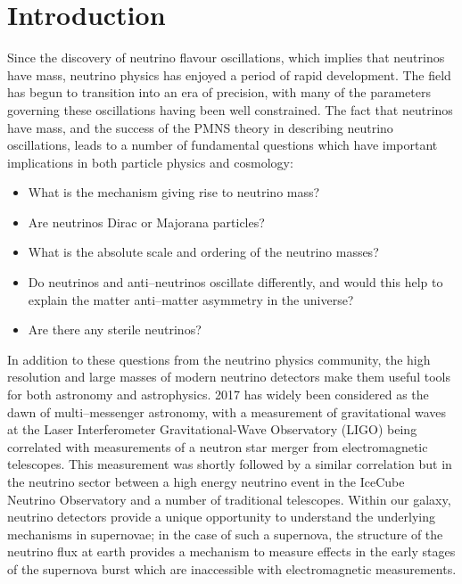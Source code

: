 \chapter{\label{ch:intro}Introduction} 

\minitoc

Since the discovery of neutrino flavour oscillations, which implies that
neutrinos have mass, neutrino physics has enjoyed a period of rapid development.
The field has begun to transition into an era of precision, with many of the
parameters governing these oscillations having been well constrained. The fact
that neutrinos have mass, and the success of the PMNS theory in describing
neutrino oscillations, leads to a number of fundamental questions which have
important implications in both particle physics and cosmology: 

\begin{itemize}
	\item What is the mechanism giving rise to neutrino mass? 
	\item Are neutrinos Dirac or Majorana particles?
	\item What is the absolute scale and ordering of the neutrino masses?
	\item Do neutrinos and anti--neutrinos oscillate differently, and would this 
	      help to explain the matter anti--matter asymmetry in the universe?
	\item Are there any sterile neutrinos?
\end{itemize}

In addition to these questions from the neutrino physics community, the high 
resolution and large masses of modern neutrino detectors make them useful 
tools for both astronomy and astrophysics. 2017 has widely been considered as 
the dawn of multi--messenger astronomy, with a measurement of gravitational 
waves at the Laser Interferometer Gravitational-Wave Observatory (LIGO) being 
correlated with measurements of a neutron star merger from electromagnetic 
telescopes\cite{Abbott2017}.  This measurement was shortly followed by a 
similar correlation but in the neutrino sector between a high energy neutrino 
event in the IceCube Neutrino Observatory and a number of traditional 
telescopes\cite{Aartsen2018}.  Within our galaxy, neutrino detectors provide a 
unique opportunity to understand the underlying mechanisms in supernovae; in 
the case of such a supernova, the structure of the neutrino flux at earth 
provides a mechanism to measure effects in the early stages of the supernova 
burst which are inaccessible with electromagnetic 
measurements\cite{Scholberg:2012id}.

